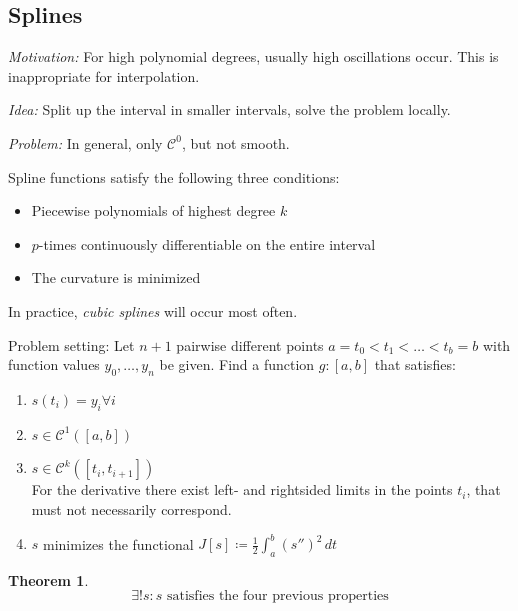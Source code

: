 \documentclass[a4paper]{article}
\newcounter{lecref}[section]
\numberwithin{lecref}{section}
\theoremstyle{break}
\newtheorem{thm}[lecref]{Theorem}
\begin{document}
\subsection{Splines}
\label{ch:4-3}

\emph{Motivation:} For high polynomial degrees, usually high oscillations occur. This is inappropriate for interpolation.

\emph{Idea:} Split up the interval in smaller intervals, solve the problem locally.

\emph{Problem:} In general, only $\mathcal C^0$, but not smooth.

Spline functions satisfy the following three conditions:
\begin{itemize}
  \item Piecewise polynomials of highest degree $k$
  \item $p$-times continuously differentiable on the entire interval
  \item The curvature is minimized
\end{itemize}
In practice, \emph{cubic splines} will occur most often.

Problem setting:
Let $n+1$ pairwise different points $a = t_0 < t_1 < \dots < t_b = b$ with function values $y_0, \dots, y_n$ be given.
Find a function $g: [a, b]$ that satisfies:
\begin{enumerate}
  \item $s(t_i) = y_i \forall i$
  \item $s \in \mathcal C^1([a, b])$
  \item $s \in \mathcal C^k([t_i, t_{i+1}])$ \\
    For the derivative there exist left- and rightsided limits in the points $t_i$, that must not necessarily correspond.
  \item $s$ minimizes the functional $J[s] \coloneqq \frac 12 \int_a^b (s'')^2 \, dt$
\end{enumerate}

\begin{thm}
  \label{thm:4-19}
  \[ \exists! s: s \text{ satisfies the four previous properties} \]
\end{thm}
\end{document}
